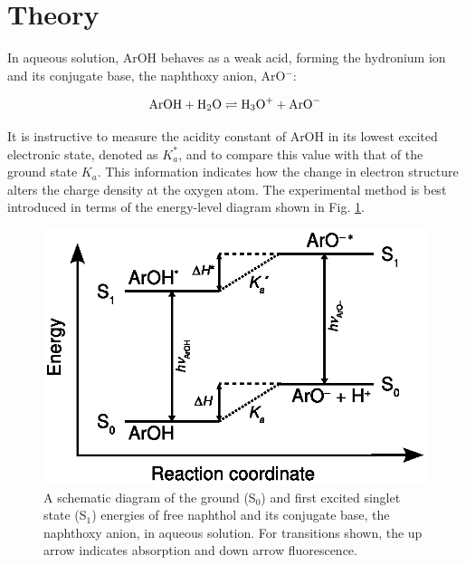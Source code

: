 \documentclass[byrevtex,amssymb,aps,pra,floatfix,letterpaper]{revtex4}
\begin{document}
\section{Theory}

In aqueous solution, ArOH behaves as a weak acid, forming the hydronium ion and its conjugate base, the naphthoxy anion, ArO$^-$:

\begin{equation}
\label{eq1}
\textnormal{ArOH} + \textnormal{H}_2\textnormal{O} \rightleftharpoons \textnormal{H}_3\textnormal{O}^+
+ \textnormal{ArO}^-
\end{equation}

\noindent
It is instructive to measure the acidity constant of ArOH in its lowest excited electronic state, denoted as $K^*_a$, and to compare this value with that of the ground state $K_a$. This information indicates how the change in electron structure alters the charge density at the oxygen atom. The experimental method is best introduced in terms of the energy-level diagram shown in Fig. \ref{fig2}.

\begin{figure}[!htp]
\begin{center}
\includegraphics[scale=0.8]{fig2}
\caption{A schematic diagram of the ground (S$_0$) and first excited singlet state (S$_1$) energies of free naphthol and its conjugate base, the naphthoxy anion, in aqueous solution. For transitions shown, the up arrow indicates absorption and down arrow fluorescence.}
\label{fig2}
\end{center}
\end{figure}
\end{document}
